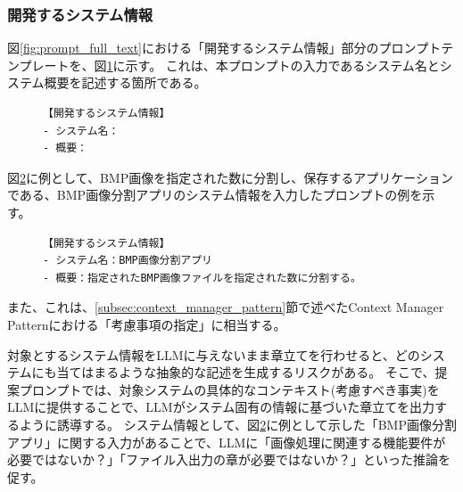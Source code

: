 \subsubsection{開発するシステム情報}

 図\ref{fig:prompt_full_text}における「開発するシステム情報」部分のプロンプトテンプレートを、図\ref{fig:development_system_info_template}に示す。
これは、本プロンプトの入力であるシステム名とシステム概要を記述する箇所である。


\begin{figure}[tp]
\begin{tcolorbox}[
  colback=white,
  colframe=blue,
  fonttitle=\bfseries,
]
\footnotesize
\ttfamily
\fontsize{10}{11}\selectfont
\begin{verbatim}
【開発するシステム情報】
- システム名：
- 概要：
\end{verbatim}
\end{tcolorbox}
\par\vspace{-20pt}
\label{fig:development_system_info_template}
\end{figure}

図\ref{fig:development_system_info}に例として、BMP画像を指定された数に分割し、保存するアプリケーションである、BMP画像分割アプリのシステム情報を入力したプロンプトの例を示す。

\begin{figure}[tp]
\begin{tcolorbox}[
  colback=white,
  colframe=blue,
  fonttitle=\bfseries,
]
\footnotesize
\ttfamily
\fontsize{10}{11}\selectfont
\begin{verbatim}
【開発するシステム情報】
- システム名：BMP画像分割アプリ
- 概要：指定されたBMP画像ファイルを指定された数に分割する。
\end{verbatim}
\end{tcolorbox}
\par\vspace{-20pt}
\label{fig:development_system_info}
\end{figure}

また、これは、\ref{subsec:context_manager_pattern}節で述べたContext Manager Patternにおける「考慮事項の指定」に相当する。

対象とするシステム情報をLLMに与えないまま章立てを行わせると、どのシステムにも当てはまるような抽象的な記述を生成するリスクがある。
そこで、提案プロンプトでは、対象システムの具体的なコンテキスト(考慮すべき事実)をLLMに提供することで、LLMがシステム固有の情報に基づいた章立てを出力するように誘導する。
システム情報として、図\ref{fig:development_system_info}に例として示した「BMP画像分割アプリ」に関する入力があることで、LLMに「画像処理に関連する機能要件が必要ではないか？」「ファイル入出力の章が必要ではないか？」といった推論を促す。


